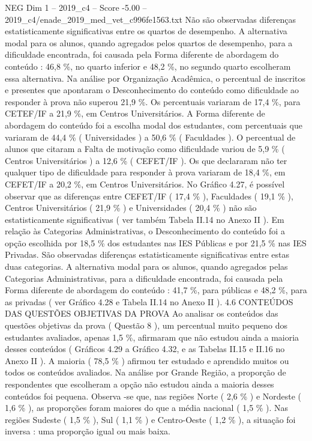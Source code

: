 \begin{textsample}{NEG Dim 1 – 2019\_c4 – Score -5.00 – 2019\_c4/enade\_2019\_med\_vet\_c996fe1563.txt}
Não são observadas diferenças estatisticamente significativas entre os quartos de desempenho.
A alternativa modal para os alunos, quando agregados pelos quartos de desempenho, para a dificuldade encontrada, foi causada pela Forma diferente de abordagem do conteúdo : 46,8 \%, no quarto inferior e 48,2 \%, no segundo quarto escolheram essa alternativa.
Na análise por Organização Acadêmica, o percentual de inscritos e presentes que apontaram o Desconhecimento do conteúdo como dificuldade ao responder à prova não superou 21,9 \%.
Os percentuais variaram de 17,4 \%, para CETEF/IF a 21,9 \%, em Centros Universitários.
A Forma diferente de abordagem do conteúdo foi a escolha modal dos estudantes, com percentuais que variaram de 44,4 \% ( Universidades ) a 50,6 \% ( Faculdades ).
O percentual de alunos que citaram a Falta de motivação como dificuldade variou de 5,9 \% ( Centros Universitários ) a 12,6 \% ( CEFET/IF ).
Os que declararam não ter qualquer tipo de dificuldade para responder à prova variaram de 18,4 \%, em CEFET/IF a 20,2 \%, em Centros Universitários.
No Gráfico 4.27, é possível observar que as diferenças entre CEFET/IF ( 17,4 \% ), Faculdades ( 19,1 \% ), Centros Universitários ( 21,9 \% ) e Universidades ( 20,4 \% ) não são estatisticamente significativas ( ver também Tabela II.14 no Anexo II ).
Em relação às Categorias Administrativas, o Desconhecimento do conteúdo foi a opção escolhida por 18,5 \% dos estudantes nas IES Públicas e por 21,5 \% nas IES Privadas.
São observadas diferenças estatisticamente significativas entre estas duas categorias.
A alternativa modal para os alunos, quando agregados pelas Categorias Administrativas, para a dificuldade encontrada, foi causada pela Forma diferente de abordagem do conteúdo : 41,7 \%, para públicas e 48,2 \%, para as privadas ( ver Gráfico 4.28 e Tabela II.14 no Anexo II ). 4.6 CONTEÚDOS DAS QUESTÕES OBJETIVAS DA PROVA Ao analisar os conteúdos das questões objetivas da prova ( Questão 8 ), um percentual muito pequeno dos estudantes avaliados, apenas 1,5 \%, afirmaram que não estudou ainda a maioria desses conteúdos ( Gráficos 4.29 a Gráfico 4.32, e as Tabelas II.15 e II.16 no Anexo II ).
A maioria ( 78,5 \% ) afirmou ter estudado e aprendido muitos ou todos os conteúdos avaliados.
Na análise por Grande Região, a proporção de respondentes que escolheram a opção não estudou ainda a maioria desses conteúdos foi pequena.
Observa -se que, nas regiões Norte ( 2,6 \% ) e Nordeste ( 1,6 \% ), as proporções foram maiores do que a média nacional ( 1,5 \% ).
Nas regiões Sudeste ( 1,5 \% ), Sul ( 1,1 \% ) e Centro-Oeste ( 1,2 \% ), a situação foi inversa : uma proporção igual ou mais baixa.

\end{textsample}
